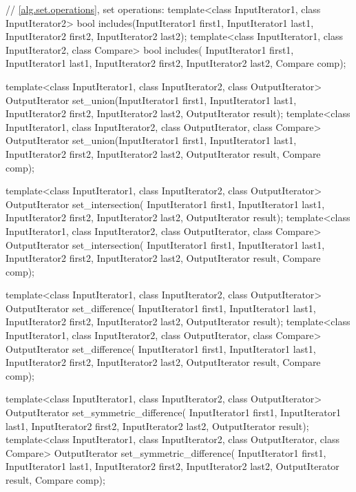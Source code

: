 \begin{codeblock}
{  // \ref{alg.set.operations}, set operations:
  template<class InputIterator1, class InputIterator2>
    bool includes(InputIterator1 first1, InputIterator1 last1,
                  InputIterator2 first2, InputIterator2 last2);
  template<class InputIterator1, class InputIterator2, class Compare>
    bool includes(
      InputIterator1 first1, InputIterator1 last1,
      InputIterator2 first2, InputIterator2 last2, Compare comp);

  template<class InputIterator1, class InputIterator2, class OutputIterator>
    OutputIterator set_union(InputIterator1 first1, InputIterator1 last1,
                             InputIterator2 first2, InputIterator2 last2,
                             OutputIterator result);
  template<class InputIterator1, class InputIterator2, class OutputIterator,
     class Compare>
    OutputIterator set_union(InputIterator1 first1, InputIterator1 last1,
                             InputIterator2 first2, InputIterator2 last2,
                             OutputIterator result, Compare comp);

  template<class InputIterator1, class InputIterator2, class OutputIterator>
    OutputIterator set_intersection(
      InputIterator1 first1, InputIterator1 last1,
      InputIterator2 first2, InputIterator2 last2,
      OutputIterator result);
  template<class InputIterator1, class InputIterator2, class OutputIterator,
     class Compare>
    OutputIterator set_intersection(
      InputIterator1 first1, InputIterator1 last1,
      InputIterator2 first2, InputIterator2 last2,
      OutputIterator result, Compare comp);

  template<class InputIterator1, class InputIterator2, class OutputIterator>
    OutputIterator set_difference(
      InputIterator1 first1, InputIterator1 last1,
      InputIterator2 first2, InputIterator2 last2,
      OutputIterator result);
  template<class InputIterator1, class InputIterator2, class OutputIterator,
     class Compare>
    OutputIterator set_difference(
      InputIterator1 first1, InputIterator1 last1,
      InputIterator2 first2, InputIterator2 last2,
      OutputIterator result, Compare comp);

  template<class InputIterator1, class InputIterator2, class OutputIterator>
    OutputIterator set_symmetric_difference(
      InputIterator1 first1, InputIterator1 last1,
      InputIterator2 first2, InputIterator2 last2,
      OutputIterator result);
  template<class InputIterator1, class InputIterator2, class OutputIterator,
      class Compare>
    OutputIterator set_symmetric_difference(
      InputIterator1 first1, InputIterator1 last1,
      InputIterator2 first2, InputIterator2 last2,
      OutputIterator result, Compare comp);

}
\end{codeblock}
